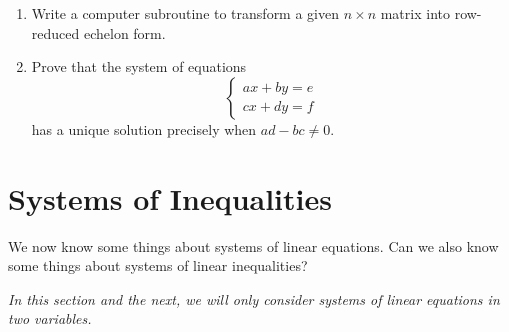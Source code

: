 \documentclass[a4paper,leqno]{article}
\numberwithin{equation}{section}
\theoremstyle{definition}
\theoremstyle{remark}
\begin{document}
\begin{enumerate}
  \item Write a computer subroutine to transform a given $ n \times n $ matrix into row-reduced echelon form.
  \item Prove that the system of equations
        \begin{equation*}
          \begin{cases}
            ax + by = e\\
            cx + dy = f
          \end{cases}
        \end{equation*}
        has a unique solution precisely when $ ad - bc \neq 0 $.
\end{enumerate}

\section{Systems of Inequalities}
We now know some things about systems of linear equations. Can we also know some things about systems of linear inequalities?

\emph{In this section and the next, we will only consider systems of linear equations in two variables.}
\end{document}
